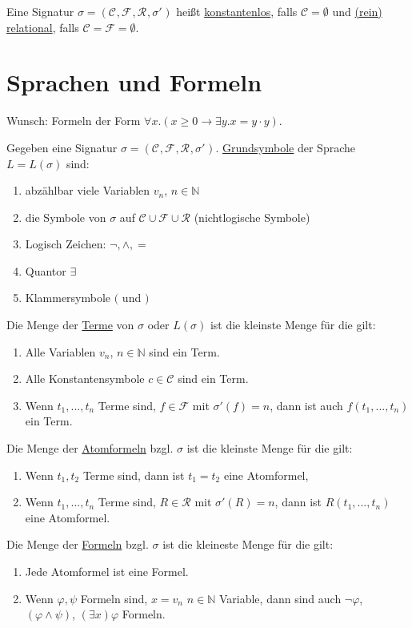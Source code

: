 \documentclass{article}
\theoremstyle{definition}
\newcommand{\calC}{\mathcal{C}}
\newcommand{\calF}{\mathcal{F}}
\newcommand{\calR}{\mathcal{R}}
\newcommand{\sign}[1]{(\calC_{#1}, \calF_{#1}, \calR_{#1}, \sigma'_{#1})}
\begin{document}
    Eine Signatur $ \sigma = \sign{} $ heißt \underline{konstantenlos}, falls $ \calC = \emptyset $ und \underline{(rein) relational}, falls $ \calC = \calF = \emptyset $.

    \section{Sprachen und Formeln}

    Wunsch: Formeln der Form $ \forall x. (x \geq 0 \rightarrow \exists y. x = y \cdot y) $.

    Gegeben eine Signatur $ \sigma = \sign{} $.
    \underline{Grundsymbole} der Sprache $ L = L(\sigma) $ sind:
    \begin{enumerate}
        \item abzählbar viele Variablen $ v_n $, $ n \in \mathbb{N} $
        \item die Symbole von $ \sigma $ auf $ \calC \cup \calF \cup \calR $ (nichtlogische Symbole)
        \item Logisch Zeichen: $ \neg, \land, = $
        \item Quantor $ \exists $
        \item Klammersymbole $ ( $ und $ ) $
    \end{enumerate}

    Die Menge der \underline{Terme} von $ \sigma $ oder $ L(\sigma) $ ist die kleinste Menge für die gilt:
    \begin{enumerate}
        \item Alle Variablen $ v_n $, $ n \in \mathbb{N} $ sind ein Term.
        \item Alle Konstantensymbole $ c \in \calC $ sind ein Term.
        \item Wenn $ t_1, ..., t_n $ Terme sind, $ f \in \calF $ mit $ \sigma'(f) = n $, dann ist auch $ f(t_1, ..., t_n) $ ein Term.
    \end{enumerate}

    Die Menge der \underline{Atomformeln} bzgl. $ \sigma $ ist die kleinste Menge für die gilt:
    \begin{enumerate}
        \item Wenn $ t_1, t_2 $ Terme sind, dann ist $ t_1 = t_2 $ eine Atomformel,
        \item Wenn $ t_1, ..., t_n $ Terme sind, $ R \in \calR $ mit $ \sigma'(R) = n $, dann ist $ R(t_1, ..., t_n) $ eine Atomformel.
    \end{enumerate}

    Die Menge der \underline{Formeln} bzgl. $\sigma $ ist die kleineste Menge für die gilt:
    \begin{enumerate}
        \item Jede Atomformel ist eine Formel.
        \item Wenn $ \varphi, \psi $ Formeln sind, $ x = v_n $ $ n \in \mathbb{N} $ Variable, dann sind auch $ \neg \varphi$, $ (\varphi \land \psi) $, $ (\exists x) \varphi $ Formeln.
    \end{enumerate}
\end{document}
